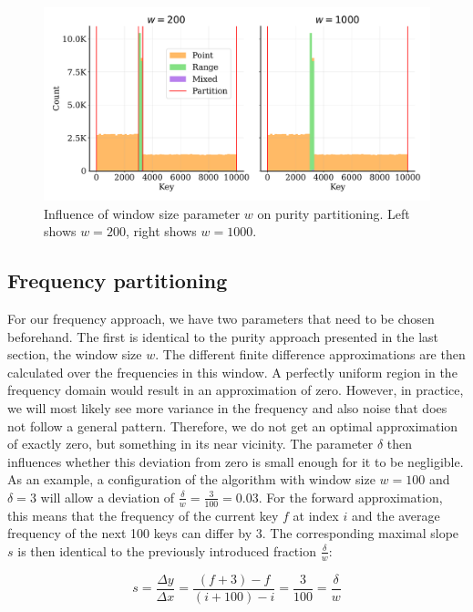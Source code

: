 \begin{figure}
    \centering
    \includegraphics[width=\textwidth]{figures/purity_influence.pdf}
    \caption[Influence of purity hyperparameter]{Influence of window size parameter $w$ on purity partitioning. Left shows $w = 200$, right shows $w = 1000$.}
    \label{fig:purinfluence}
\end{figure}

\subsection{Frequency partitioning}
For our frequency approach, we have two parameters that need to be chosen beforehand. The first is identical to the purity approach presented in the last section, the window size $w$. The different finite difference approximations are then calculated over the frequencies in this window. A perfectly uniform region in the frequency domain would result in an approximation of zero. However, in practice, we will most likely see more variance in the frequency and also noise that does not follow a general pattern. Therefore, we do not get an optimal approximation of exactly zero, but something in its near vicinity. The parameter $\delta$ then influences whether this deviation from zero is small enough for it to be negligible. As an example, a configuration of the algorithm with window size $w = 100$ and $\delta = 3$ will allow a deviation of $\frac{\delta}{w} = \frac{3}{100} = 0.03$. For the forward approximation, this means that the frequency of the current key $f$ at index $i$ and the average frequency of the next 100 keys can differ by 3. The corresponding maximal slope $s$ is then identical to the previously introduced fraction $\frac{\delta}{w}$:

$$
s = \frac{\Delta y}{\Delta x} = \frac{(f + 3) - f}{(i + 100) - i} = \frac{3}{100} = \frac{\delta}{w}
$$

